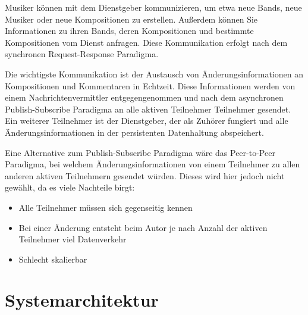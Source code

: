 \documentclass[12pt]{scrartcl}
\begin{document}
Musiker können mit dem Dienstgeber kommunizieren, um etwa neue Bands, neue Musiker oder neue Kompositionen zu erstellen. Außerdem können Sie Informationen zu ihren Bands, deren Kompositionen und bestimmte Kompositionen vom Dienst anfragen. Diese Kommunikation erfolgt nach dem synchronen Request-Response Paradigma.

Die wichtigste Kommunikation ist der Austausch von Änderungsinformationen an Kompositionen und Kommentaren in Echtzeit. Diese Informationen werden von einem Nachrichtenvermittler entgegengenommen und nach dem asynchronen Publish-Subscribe Paradigma an alle aktiven Teilnehmer Teilnehmer gesendet. Ein weiterer Teilnehmer ist der Dienstgeber, der als Zuhörer fungiert und alle Änderungsinformationen in der persistenten Datenhaltung abspeichert.

Eine Alternative zum Publish-Subscribe Paradigma wäre das Peer-to-Peer Paradigma, bei welchem Änderungsinformationen von einem Teilnehmer zu allen anderen aktiven Teilnehmern gesendet würden. Dieses wird hier jedoch nicht gewählt, da es viele Nachteile birgt:
\begin{itemize}
\item Alle Teilnehmer müssen sich gegenseitig kennen
\item Bei einer Änderung entsteht beim Autor je nach Anzahl der aktiven Teilnehmer viel Datenverkehr
\item Schlecht skalierbar
\end{itemize}


\section{Systemarchitektur}



\end{document}
